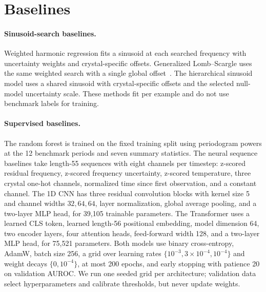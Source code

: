 \documentclass{article}
\begin{document}
\section{Baselines}

\paragraph{Sinusoid-search baselines.}
Weighted harmonic regression fits a sinusoid at each searched frequency with uncertainty weights and crystal-specific offsets.  Generalized Lomb--Scargle uses the same weighted search with a single global offset~\citep{lomb1976least,scargle1982studies,zechmeister2009generalised}.  The hierarchical sinusoid model uses a shared sinusoid with crystal-specific offsets and the selected null-model uncertainty scale.  These methods fit per example and do not use benchmark labels for training.

\paragraph{Supervised baselines.}
The random forest is trained on the fixed training split using periodogram powers at the 12 benchmark periods and seven summary statistics.  The neural sequence baselines take length-55 sequences with eight channels per timestep: z-scored residual frequency, z-scored frequency uncertainty, z-scored temperature, three crystal one-hot channels, normalized time since first observation, and a constant channel.  The 1D CNN has three residual convolution blocks with kernel size 5 and channel widths \(32,64,64\), layer normalization, global average pooling, and a two-layer MLP head, for 39,105 trainable parameters.  The Transformer uses a learned CLS token, learned length-56 positional embedding, model dimension 64, two encoder layers, four attention heads, feed-forward width 128, and a two-layer MLP head, for 75,521 parameters.  Both models use binary cross-entropy, AdamW, batch size 256, a grid over learning rates \(\{10^{-3},3\times10^{-4},10^{-4}\}\) and weight decays \(\{0,10^{-4}\}\), at most 200 epochs, and early stopping with patience 20 on validation AUROC.  We run one seeded grid per architecture; validation data select hyperparameters and calibrate thresholds, but never update weights.
\end{document}
